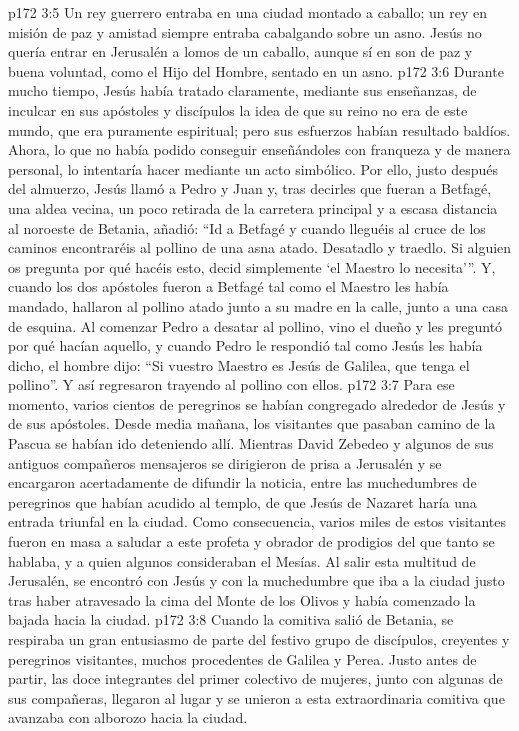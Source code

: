 \vs p172 3:5 \pc Un rey guerrero entraba en una ciudad montado a caballo; un rey en misión de paz y amistad siempre entraba cabalgando sobre un asno. Jesús no quería entrar en Jerusalén a lomos de un caballo, aunque sí en son de paz y buena voluntad, como el Hijo del Hombre, sentado en un asno.
\vs p172 3:6 \pc Durante mucho tiempo, Jesús había tratado claramente, mediante sus enseñanzas, de inculcar en sus apóstoles y discípulos la idea de que su reino no era de este mundo, que era puramente espiritual; pero sus esfuerzos habían resultado baldíos. Ahora, lo que no había podido conseguir enseñándoles con franqueza y de manera personal, lo intentaría hacer mediante un acto simbólico. Por ello, justo después del almuerzo, Jesús llamó a Pedro y Juan y, tras decirles que fueran a Betfagé, una aldea vecina, un poco retirada de la carretera principal y a escasa distancia al noroeste de Betania, añadió: “Id a Betfagé y cuando lleguéis al cruce de los caminos encontraréis al pollino de una asna atado. Desatadlo y traedlo. Si alguien os pregunta por qué hacéis esto, decid simplemente ‘el Maestro lo necesita’”. Y, cuando los dos apóstoles fueron a Betfagé tal como el Maestro les había mandado, hallaron al pollino atado junto a su madre en la calle, junto a una casa de esquina. Al comenzar Pedro a desatar al pollino, vino el dueño y les preguntó por qué hacían aquello, y cuando Pedro le respondió tal como Jesús les había dicho, el hombre dijo: “Si vuestro Maestro es Jesús de Galilea, que tenga el pollino”. Y así regresaron trayendo al pollino con ellos.
\vs p172 3:7 Para ese momento, varios cientos de peregrinos se habían congregado alrededor de Jesús y de sus apóstoles. Desde media mañana, los visitantes que pasaban camino de la Pascua se habían ido deteniendo allí. Mientras David Zebedeo y algunos de sus antiguos compañeros mensajeros se dirigieron de prisa a Jerusalén y se encargaron acertadamente de difundir la noticia, entre las muchedumbres de peregrinos que habían acudido al templo, de que Jesús de Nazaret haría una entrada triunfal en la ciudad. Como consecuencia, varios miles de estos visitantes fueron en masa a saludar a este profeta y obrador de prodigios del que tanto se hablaba, y a quien algunos consideraban el Mesías. Al salir esta multitud de Jerusalén, se encontró con Jesús y con la muchedumbre que iba a la ciudad justo tras haber atravesado la cima del Monte de los Olivos y había comenzado la bajada hacia la ciudad.
\vs p172 3:8 Cuando la comitiva salió de Betania, se respiraba un gran entusiasmo de parte del festivo grupo de discípulos, creyentes y peregrinos visitantes, muchos procedentes de Galilea y Perea. Justo antes de partir, las doce integrantes del primer colectivo de mujeres, junto con algunas de sus compañeras, llegaron al lugar y se unieron a esta extraordinaria comitiva que avanzaba con alborozo hacia la ciudad.

